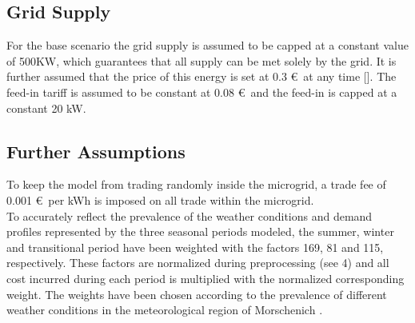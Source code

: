 \documentclass[
	11pt,								%
	DIV10,								%
	a4paper,         					%
	oneside,							%
	headheight=20pt,					%
	footheight=20pt,					%
    parskip=full,						%
    listof=totoc,						%
	bibliography=totoc,					%
	index=totoc,						%
]{scrartcl}
\begin{document}
\subsection{Grid Supply}
For the base scenario the grid supply is assumed to be capped at a constant value of 500KW, which guarantees that all supply can be met solely by the grid. It is further assumed that the price of this energy is set at 0.3 \euro\ at any time [\cite{Monitoringbericht20182018}]. The feed-in tariff is assumed to be constant at 0.08 \euro\ and the feed-in is capped at a constant 20 kW.

\subsection{Further Assumptions}
To keep the model from trading randomly inside the microgrid, a trade fee of 0.001 \euro\ per kWh is imposed on all trade within the microgrid.\\
To accurately reflect the prevalence of the weather conditions and demand profiles represented by the three seasonal periods modeled, the summer, winter and transitional period have been weighted with the factors 169, 81 and 115, respectively. These factors are normalized during preprocessing (see 4) and all cost incurred during each period is multiplied with the normalized corresponding weight. The weights have been chosen according to the prevalence of different weather conditions in the meteorological region of Morschenich \cite{ReferenzlastprofileUndMehrfamilien2008}.
\end{document}
